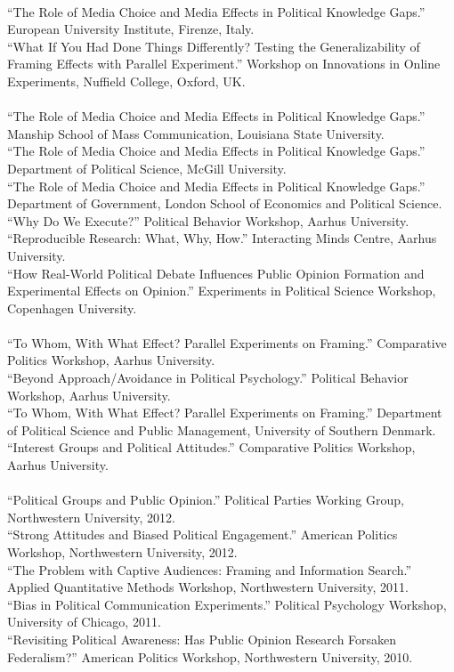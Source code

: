 \documentclass[12pt]{article}
\newcommand{\topic}[1]{\pagebreak[3]\indent {\color{lg}{\footnotesize #1 }}\\}
\newcommand{\entry}[1]{\indent {\color{lg}\guillemotright}\hspace{2pt}#1\vspace{.25em}\\}
\begin{document}
	\topic{Invited Presentations (2015)}
	\entry{``The Role of Media Choice and Media Effects in Political Knowledge Gaps.'' European University Institute, Firenze, Italy.}
	\entry{``What If You Had Done Things Differently? Testing the Generalizability of Framing Effects with Parallel Experiment.'' Workshop on Innovations in Online Experiments, Nuffield College, Oxford, UK.}
	
	\topic{Invited Presentations (2014)}
	\entry{``The Role of Media Choice and Media Effects in Political Knowledge Gaps.'' Manship School of Mass Communication, Louisiana State University.}
	\entry{``The Role of Media Choice and Media Effects in Political Knowledge Gaps.'' Department of Political Science, McGill University.}
	\entry{``The Role of Media Choice and Media Effects in Political Knowledge Gaps.'' Department of Government, London School of Economics and Political Science.}
	\entry{``Why Do We Execute?'' Political Behavior Workshop, Aarhus University.}
	\entry{``Reproducible Research: What, Why, How.'' Interacting Minds Centre, Aarhus University.}
	\entry{``How Real-World Political Debate Influences Public Opinion Formation and Experimental Effects on Opinion.'' Experiments in Political Science Workshop, Copenhagen University.}

	\topic{Invited Presentations (2013)}
	\entry{``To Whom, With What Effect? Parallel Experiments on Framing.'' Comparative Politics Workshop, Aarhus University.}
	\entry{``Beyond Approach/Avoidance in Political Psychology.'' Political Behavior Workshop, Aarhus University.}
	\entry{``To Whom, With What Effect? Parallel Experiments on Framing.'' Department of Political Science and Public Management, University of Southern Denmark.}
	\entry{``Interest Groups and Political Attitudes.'' Comparative Politics Workshop, Aarhus University.}
	
	\topic{Invited Presentations (2012 and earlier)}
	\entry{``Political Groups and Public Opinion.'' Political Parties Working Group, Northwestern University, 2012.}
	\entry{``Strong Attitudes and Biased Political Engagement.'' American Politics Workshop, Northwestern University, 2012.}
	\entry{``The Problem with Captive Audiences: Framing and Information Search.'' Applied Quantitative Methods Workshop, Northwestern University, 2011.}
	\entry{``Bias in Political Communication Experiments.'' Political Psychology Workshop, University of Chicago, 2011.}
	\entry{``Revisiting Political Awareness: Has Public Opinion Research Forsaken Federalism?'' American Politics Workshop, Northwestern University, 2010.}
\end{document}
